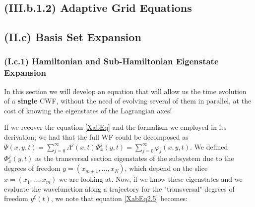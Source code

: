 \documentclass[11pt, a4paper]{article} %
\begin{document}

\subsection*{(III.b.1.2) Adaptive Grid Equations}



\subsection*{(II.c) Basis Set Expansion}
\subsubsection*{(I.c.1) Hamiltonian and Sub-Hamiltonian Eigenstate Expansion}
In this section we will develop an equation that will allow us the time evolution of a {\bf single} CWF, without the need of evolving several of them in parallel, at the cost of knowing the eigenstates of the Lagrangian axes!

If we recover the equation \eqref{XabEq} and the formalism we employed in its derivation, we had that the full WF could be decomposed as $\Psi(x,y,t)=\sum_{j=0}^\infty\Lambda^j(x,t)\Phi^j_x(y,t)=\sum_{j=0}^\infty \varphi_j(x,y,t)$. We defined $\Phi^j_x(y,t)$ as the transversal section eigenstates of the subsystem due to the degrees of freedom $y=(x_{m+1},...,x_N)$, which depend on the slice $x=(x_1,...,x_m)$ we are looking at. Now, if we know these eigenstates and we evaluate the wavefunction along a trajectory for the "transversal" degrees of freedom $y^\xi(t)$, we note that equation \eqref{XabEq2.5} becomes:
\end{document}
